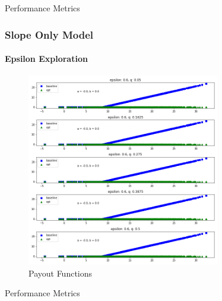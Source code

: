 \documentclass[11pt]{article}
\begin{document}
            \begin{table}[H]
                \centering
                \caption{Performance Metrics}
                
            \end{table}

            \FloatBarrier

    \subsubsection*{Slope Only Model}
        \paragraph*{Epsilon Exploration}
            \begin{figure}[H]
                \centering
                \caption{Payout Functions}
                \includegraphics[width=0.75\textwidth]{../../output/figures/Premium/epsilon_exploration_slope.png}
            \end{figure}

            \begin{table}[H]
                \centering
                \caption{Performance Metrics}
                
            \end{table}

            \FloatBarrier
\end{document}
